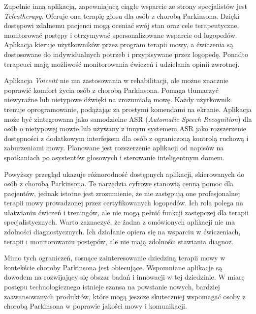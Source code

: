 Zupełnie inną aplikacją, zapewniającą ciągłe wsparcie ze strony specjalistów jest \emph{Teleatherapy}.
Oferuje ona terapię głosu dla osób z chorobą Parkinsona.
Dzięki dostępowi zdalnemu pacjenci mogą oceniać swój stan oraz cele terapeutyczne, monitorować postępy i otrzymywać spersonalizowane wsparcie od logopedów.
Aplikacja kieruje użytkowników przez program terapii mowy, a ćwiczenia są dostosowane do indywidualnych potrzeb i przypisywane przez logopedę.
Ponadto terapeuci mają możliwość monitorowania ćwiczeń i udzielania opinii zwrotnej.

Aplikacja \emph{Voiceitt} nie ma zastosowania w rehabilitacji, ale możne znacznie poprawić komfort życia osób z chorobą Parkinsona.
Pomaga tłumaczyć niewyraźne lub nietypowe dźwięki na zrozumiałą mowę.
Każdy użytkownik trenuje oprogramowanie, podążając za prostymi komendami na ekranie.
Aplikacja może być zintegrowana jako samodzielne ASR (\emph{Automatic Speech Recognition}) dla osób o nietypowej mowie lub używany z innym systemem ASR
jako rozszerzenie dostępności z dodatkowym interfejsem dla osób z ograniczoną kontrolą ruchową i zaburzeniami mowy.
Planowane jest rozszerzenie aplikacji od napisów na spotkaniach po asystentów głosowych i sterowanie inteligentnym domem.

Powyższy przegląd ukazuje różnorodność dostępnych aplikacji, skierowanych do osób z chorobą Parkinsona.
Te narzędzia cyfrowe stanowią cenną pomoc dla pacjentów, jednak istotne jest zrozumienie, że nie zastępują one profesjonalnej terapii mowy prowadzonej
przez certyfikowanych logopedów.
Ich rola polega na ułatwianiu ćwiczeń i treningów, ale nie mogą pełnić funkcji zastępczej dla terapii specjalistycznych.
Warto zaznaczyć, że żadna z omówionych aplikacji nie ma zdolności diagnostycznych.
Ich działanie opiera się na wsparciu w ćwiczeniach, terapii i monitorowaniu postępów, ale nie mają zdolności stawiania diagnoz.

Mimo tych ograniczeń, rosnące zainteresowanie dziedziną terapii mowy w kontekście choroby Parkinsona jest obiecujące.
Wspomniane aplikacje są dowodem na rozwijający się obszar badań i innowacji w tej dziedzinie.
W miarę postępu technologicznego istnieje szansa na powstanie nowych, bardziej zaawansowanych produktów, które mogą jeszcze skuteczniej wspomagać
osoby z chorobą Parkinsona w poprawie jakości mowy i komunikacji.
